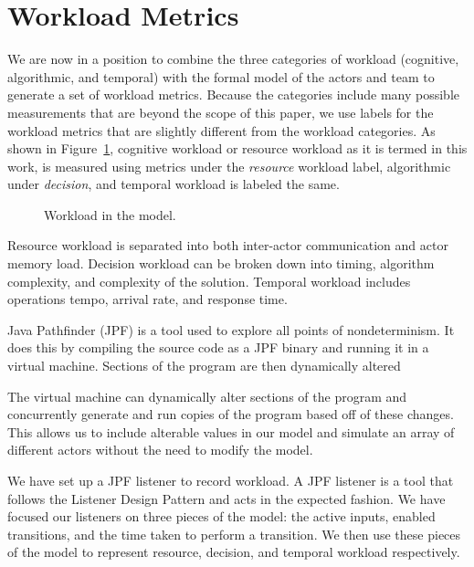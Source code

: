\section{Workload Metrics}
We are now in a position to combine the three categories of workload (cognitive, algorithmic, and temporal) with the formal model of the actors and team to generate a set of workload metrics.  Because the categories include many possible measurements that are beyond the scope of this paper, we use labels for the workload metrics that are slightly different from the workload categories.  As shown in Figure~\ref{fig:WorkloadMetrics}, cognitive workload or resource workload as it is termed in this work, is measured using metrics under the {\em resource} workload label, algorithmic under {\em decision}, and temporal workload is labeled the same. 


\begin{figure}[h]
\center
\setlength{\abovecaptionskip}{1mm}
\setlength{\belowcaptionskip}{1mm}
\setlength{\textfloatsep}{1mm}
\setlength{\floatsep}{1mm}
\caption{Workload in the model.}
\label{fig:WorkloadMetrics}
\end{figure}

Resource workload is separated into both inter-actor communication and actor
memory load. Decision workload can be broken down into timing, algorithm complexity, and complexity of the solution. Temporal workload includes operations tempo, arrival rate, and response time.

Java Pathfinder (JPF) is a tool used to explore all points of nondeterminism.
It does this by compiling the source code as a JPF binary and
running it in a virtual machine.
Sections of the program are then dynamically altered 

The virtual machine can dynamically alter sections of the program and concurrently generate and run copies of the program
based off of these changes. This allows us to include alterable values in our
model and simulate an array of different actors without the need to modify the
model.

We have set up a JPF listener to record workload. A JPF listener is a tool that
follows the Listener Design Pattern and acts in the expected fashion. We have
focused our listeners on three pieces of the model: the active inputs, enabled
transitions, and the time taken to perform a transition. We then use these
pieces of the model to represent resource, decision, and temporal workload respectively.
